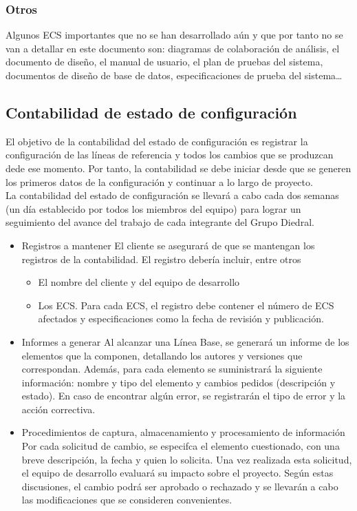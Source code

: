 \documentclass[11pt, a4paper, twoside, titlepage]{article}
\begin{document}
			\subsubsection{Otros}
				Algunos ECS importantes que no se han desarrollado aún y que por tanto no se van a detallar en este documento son: diagramas de colaboración de análisis, el documento de diseño, el manual de usuario, el plan de pruebas del sistema, documentos de diseño de base de datos, especificaciones de prueba del sistema\ldots

		\subsection{Contabilidad de estado de configuración} %
			El objetivo de la contabilidad del estado de configuración es registrar la configuración de las líneas de referencia y todos los cambios que se produzcan dede ese momento. Por tanto, la contabilidad se debe iniciar desde que se generen los primeros datos de la configuración y continuar a lo largo de proyecto. \\			

			La contabilidad del estado de configuración se llevará a cabo cada dos semanas (un día establecido por todos los miembros del equipo) para lograr un seguimiento del avance del trabajo de cada integrante del Grupo Diedral.
			
			\begin{itemize}
				\item Registros a mantener
				El cliente se asegurará de que se mantengan los registros de la contabilidad. El registro debería incluir, entre otros
					\begin{itemize}
					\item El nombre del cliente y del equipo de desarrollo 
					\item Los ECS. Para cada ECS, el registro debe contener el número de ECS afectados y especificaciones como la fecha de revisión y publicación.
					\end{itemize}

				\item Informes a generar
				Al alcanzar una Línea Base, se generará un informe de los elementos que la componen, detallando los autores y versiones que correspondan. Además, para cada elemento se suministrará la siguiente información: nombre y tipo del elemento y cambios pedidos (descripción y estado). En caso de encontrar algún error, se registrarán el tipo de error y la acción correctiva.

				\item Procedimientos de captura, almacenamiento y procesamiento de información
				Por cada solicitud de cambio, se especifca el elemento cuestionado, con una breve descripción, la fecha y quien lo solicita. Una vez realizada esta solicitud, el equipo de desarrollo evaluará su impacto sobre el proyecto. Según estas discusiones, el cambio podrá ser aprobado o rechazado y se llevarán a cabo las modificaciones que se consideren convenientes. 

			\end{itemize}
\end{document}
